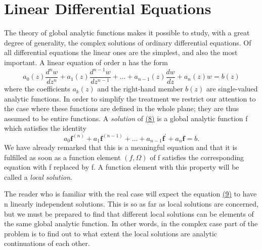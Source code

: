 \setcounter{section}{3}\section{Linear Differential Equations}\label{sec:8.4}
The theory of global analytic functions makes it possible to study, with a great degree of generality, the complex solutions of ordinary differential equations. Of all differential equations the linear ones are the simplest, and also the most important. A linear equation of order n has the form
\begin{equation*}
a _ {0} (z) \frac {d ^ {n} w}{d z ^ {n}} + a _ {1} (z) \frac {d ^ {n - 1} w}{d z ^ {n - 1}} + \dots + a _ {n - 1} (z) \frac {d w}{d z} + a _ {n} (z) w = b (z)\tag{8}\label{eq:8.8}
\end{equation*}
where the coefficients $a_{k}(z)$ and the right-hand member $b(z)$ are single-valued analytic functions. In order to simplify the treatment we restrict our attention to the case where these functions are defined in the whole plane; they are thus assumed to be entire functions. A \emph{solution} of \hyperref[eq:8.8]{(8)} is a global analytic function f which satisfies the identity
\begin{equation*}
a _ {0} \mathbf {f} ^ {(n)} + a _ {1} \mathbf {f} ^ {(n - 1)} + \dots + a _ {n - 1} \mathbf {f} ^ {\prime} + a _ {n} \mathbf {f} = b.\tag{9}\label{eq:8.9}
\end{equation*}
We have already remarked that this is a meaningful equation and that it is fulfilled as soon as a function element $(f,\Omega)$ of f satisfies the corresponding equation with f replaced by f. A function element with this property will be called a \emph{local solution}.

The reader who is familiar with the real case will expect the equation \hyperref[eq:8.9]{(9)} to have n linearly independent solutions. This is so as far as local solutions are concerned, but we must be prepared to find that different local solutions can be elements of the same global analytic function. In other words, in the complex case part of the problem is to find out to what extent the local solutions are analytic continuations of each other.

